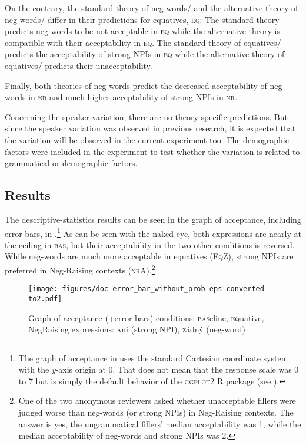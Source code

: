 \documentclass[output=paper,colorlinks,citecolor=brown]{langscibook}
\begin{document}
On the contrary, the standard theory of neg-words/\citet{zeijlstra2004sentential} and the alternative theory of neg-words/\citet{ovalle2004double} differ in their predictions for equatives, \textsc{eq}: The standard theory predicts neg-words to be not acceptable in \textsc{eq} while the alternative theory is compatible with their acceptability in \textsc{eq}. The standard theory of equatives/\citet{rullmann1995maximality} predicts the acceptability of strong NPIs in \textsc{eq} while the alternative theory of equatives/\citet{penka2016degree} predicts their unacceptability. 

Finally, both theories of neg-words predict the decreased acceptability of neg-words in \textsc{nr} and much higher acceptability of strong NPIs in \textsc{nr}.

Concerning the speaker variation, there are no theory-specific predictions. But since the speaker variation was observed in previous research, it is expected that the variation will be observed in the current experiment too. The demographic factors were included in the experiment to test whether the variation is related to grammatical or demographic factors.



\subsection{Results}
\largerpage
The descriptive-statistics results can be seen in the graph of acceptance, including error bars, in .\footnote{The graph of acceptance in  uses the standard Cartesian coordinate system with the \textit{y}-axis origin at 0. That does not mean that the response scale was 0 to 7 but is simply the default behavior of the \textsc{ggplot2} R package (see \citealt{ggplot}).}
As can be seen with the naked eye, both expressions are nearly at the ceiling in \textsc{bas}, but their acceptability in the two other conditions is reversed. While neg-words are much more acceptable in equatives (\textsc{EqZ}), strong NPIs are preferred in Neg-Raising contexts (\textsc{nrA}).\footnote{One of the two anonymous reviewers asked whether unacceptable fillers were judged worse than neg-words (or strong NPIs) in Neg-Raising contexts. The answer is yes, the ungrammatical fillers' median acceptability was 1, while the median acceptability of neg-words and strong NPIs was 2.}

\begin{figure}
  \caption{Graph of acceptance (+error bars) conditions: \textsc{bas}eline, \textsc{eq}uative, \textsc{N}eg\textsc{R}aising expressions: \textsc{a}ni (strong NPI), \textsc{z}ádný (neg-word)}
  \texttt{[image: figures/doc-error\_bar\_without\_prob-eps-converted-to2.pdf]}
  \label{fig-error-bar}
\end{figure}
\end{document}
